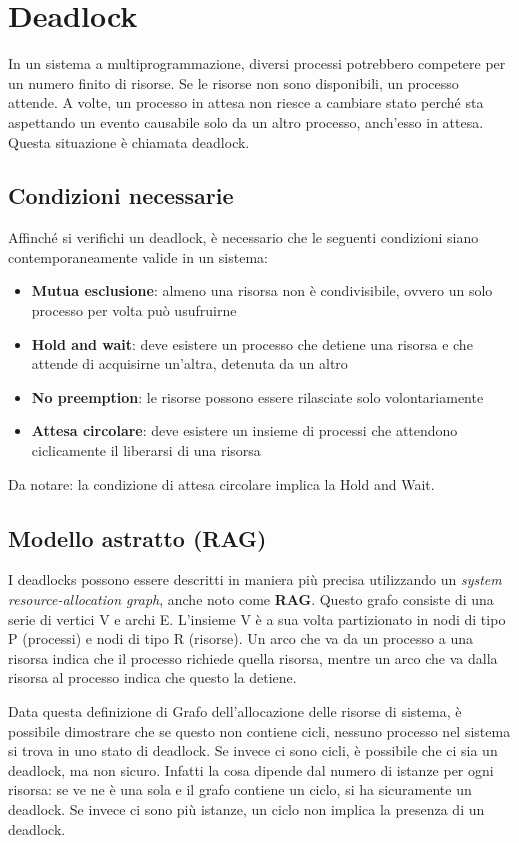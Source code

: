 \documentclass[a4paper]{article}
\begin{document}
\section{Deadlock}
In un sistema a multiprogrammazione, diversi processi potrebbero competere per un numero finito di risorse. Se le risorse non sono disponibili, un processo attende. A volte, un processo in attesa non riesce a cambiare stato perché sta aspettando un evento causabile solo da un altro processo, anch'esso in attesa. Questa situazione è chiamata deadlock.

\subsection{Condizioni necessarie}

Affinché si verifichi un deadlock, è necessario che le seguenti condizioni siano contemporaneamente valide in un sistema:
\begin{itemize}
    \item \textbf{Mutua esclusione}: almeno una risorsa non è condivisibile, ovvero un solo processo per volta può usufruirne
    \item \textbf{Hold and wait}: deve esistere un processo che detiene una risorsa e che attende di acquisirne un'altra, detenuta da un altro
    \item \textbf{No preemption}: le risorse possono essere rilasciate solo volontariamente
    \item \textbf{Attesa circolare}: deve esistere un insieme di processi che attendono ciclicamente il liberarsi di una risorsa
\end{itemize}
Da notare: la condizione di attesa circolare implica la Hold and Wait.

\subsection{Modello astratto (RAG)}
I deadlocks possono essere descritti in maniera più precisa utilizzando un \textit{system resource-allocation graph}, anche noto come \textbf{RAG}. Questo grafo consiste di una serie di vertici V e archi E. L'insieme V è a sua volta partizionato in nodi di tipo P (processi) e nodi di tipo R (risorse). Un arco che va da un processo a una risorsa indica che il processo richiede quella risorsa, mentre un arco che va dalla risorsa al processo indica che questo la detiene.

Data questa definizione di Grafo dell'allocazione delle risorse di sistema, è possibile dimostrare che se questo non contiene cicli, nessuno processo nel sistema si trova in uno stato di deadlock. Se invece ci sono cicli, è possibile che ci sia un deadlock, ma non sicuro. Infatti la cosa dipende dal numero di istanze per ogni risorsa: se ve ne è una sola e il grafo contiene un ciclo, si ha sicuramente un deadlock. Se invece ci sono più istanze, un ciclo non implica la presenza di un deadlock.
\end{document}
